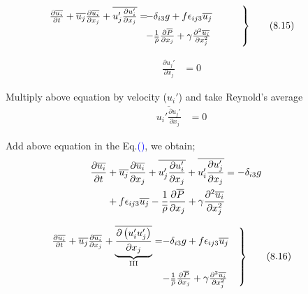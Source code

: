 \documentclass[fleqn,10pt]{SelfArx} %
\newcommand{\myeqref}[1]{Eq.\textcolor{blue}{\textup{(\getrefnumber{#1})}}}
\begin{document}
\begin{align*}
	\begin{rcases}
		\mspace{-20mu} \frac{\partial \overline{u_i}}{\partial t} + \overline{u_j}\frac{\partial \overline{u_i}}{\partial x_j} + \overline{u_j'\frac{\partial u_i'}{\partial x_j}} = \!\!\!\!\!\!\! &- \delta_{i3}g + f \epsilon_{ij3}\overline{u_j} \qquad \quad\\
		& - \frac{1}{\overline{\rho}}\frac{\partial\overline{P}}{\partial x_j} + \gamma\frac{\partial^2 \overline{u_i}}{\partial x_j^2}
	\end{rcases} & \tag{8.15} \label{eq:8.15}
\end{align*}

\begin{align*}
	\frac{\partial u_j'}{\partial x_j} & = 0
\end{align*}

Multiply above equation by velocity ($u_i'$) and take Reynold's average
\begin{align*}
	\overline{u_i'\frac{\partial u_j'}{\partial x_j}} & = 0
\end{align*}

Add above equation in the \myeqref{eq:8.15}, we  obtain;
\begin{align*}
	\mspace{-20mu} \frac{\partial \overline{u_i}}{\partial t} & + \overline{u_j}\frac{\partial \overline{u_i}}{\partial x_j} + \overline{u_j'\frac{\partial u_i'}{\partial x_j}} + \overline{u_i'\frac{\partial u_j'}{\partial x_j}} =  - \delta_{i3}g \\ 
	& + f \epsilon_{ij3}\overline{u_j} - \frac{1}{\overline{\rho}}\frac{\partial\overline{P}}{\partial x_j} + \gamma\frac{\partial^2 \overline{u_i}}{\partial x_j^2}
\end{align*}

\begin{align*}
	\begin{rcases}
		\mspace{-20mu} \frac{\partial \overline{u_i}}{\partial t} + \overline{u_j}\frac{\partial \overline{u_i}}{\partial x_j} + \underbrace{\overline{\frac{\partial \left( u_i' u_j' \right)}{\partial x_j}}}_{\text{III}} = & \!\!\!\!\!\! - \delta_{i3}g + f \epsilon_{ij3}\overline{u_j} \quad \\
		& \!\!\!\!\!\! - \frac{1}{\overline{\rho}}\frac{\partial\overline{P}}{\partial x_j} + \gamma\frac{\partial^2 \overline{u_i}}{\partial x_j^2}
	\end{rcases} & \tag{8.16} \label{eq:momentumfluxeqiation-turbulence}
\end{align*}
\end{document}

